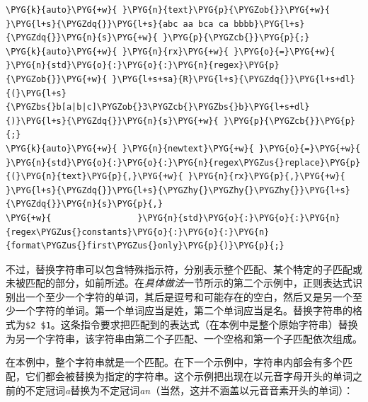 \begin{codeblockbg}
\begin{Verbatim}[commandchars=\\\{\},breaklines=true,breakanywhere=true,fontsize=\codefont,xleftmargin=17bp]
\PYG{k}{auto}\PYG{+w}{ }\PYG{n}{text}\PYG{p}{\PYGZob{}}\PYG{+w}{ }\PYG{l+s}{\PYGZdq{}}\PYG{l+s}{abc aa bca ca bbbb}\PYG{l+s}{\PYGZdq{}}\PYG{n}{s}\PYG{+w}{ }\PYG{p}{\PYGZcb{}}\PYG{p}{;}
\PYG{k}{auto}\PYG{+w}{ }\PYG{n}{rx}\PYG{+w}{ }\PYG{o}{=}\PYG{+w}{ }\PYG{n}{std}\PYG{o}{:}\PYG{o}{:}\PYG{n}{regex}\PYG{p}{\PYGZob{}}\PYG{+w}{ }\PYG{l+s+sa}{R}\PYG{l+s}{\PYGZdq{}}\PYG{l+s+dl}{(}\PYG{l+s}{\PYGZbs{}b[a|b|c]\PYGZob{}3\PYGZcb{}\PYGZbs{}b}\PYG{l+s+dl}{)}\PYG{l+s}{\PYGZdq{}}\PYG{n}{s}\PYG{+w}{ }\PYG{p}{\PYGZcb{}}\PYG{p}{;}
\PYG{k}{auto}\PYG{+w}{ }\PYG{n}{newtext}\PYG{+w}{ }\PYG{o}{=}\PYG{+w}{ }\PYG{n}{std}\PYG{o}{:}\PYG{o}{:}\PYG{n}{regex\PYGZus{}replace}\PYG{p}{(}\PYG{n}{text}\PYG{p}{,}\PYG{+w}{ }\PYG{n}{rx}\PYG{p}{,}\PYG{+w}{ }\PYG{l+s}{\PYGZdq{}}\PYG{l+s}{\PYGZhy{}\PYGZhy{}\PYGZhy{}}\PYG{l+s}{\PYGZdq{}}\PYG{n}{s}\PYG{p}{,}
\PYG{+w}{                 }\PYG{n}{std}\PYG{o}{:}\PYG{o}{:}\PYG{n}{regex\PYGZus{}constants}\PYG{o}{:}\PYG{o}{:}\PYG{n}{format\PYGZus{}first\PYGZus{}only}\PYG{p}{)}\PYG{p}{;}
\end{Verbatim}
\end{codeblockbg}



不过，替换字符串可以包含特殊指示符，分别表示整个匹配、某个特定的子匹配或未被匹配的部分，如前所述。在\textit{具体做法}一节所示的第二个示例中，正则表达式识别出一个至少一个字符的单词，其后是逗号和可能存在的空白，然后又是另一个至少一个字符的单词。第一个单词应当是姓，第二个单词应当是名。替换字符串的格式为\texttt{\$2 \$1}。这条指令要求把匹配到的表达式（在本例中是整个原始字符串）替换为另一个字符串，该字符串由第二个子匹配、一个空格和第一个子匹配依次组成。



在本例中，整个字符串就是一个匹配。在下一个示例中，字符串内部会有多个匹配，它们都会被替换为指定的字符串。这个示例把出现在以元音字母开头的单词之前的不定冠词\textit{a}替换为不定冠词\textit{an}（当然，这并不涵盖以元音音素开头的单词）：



